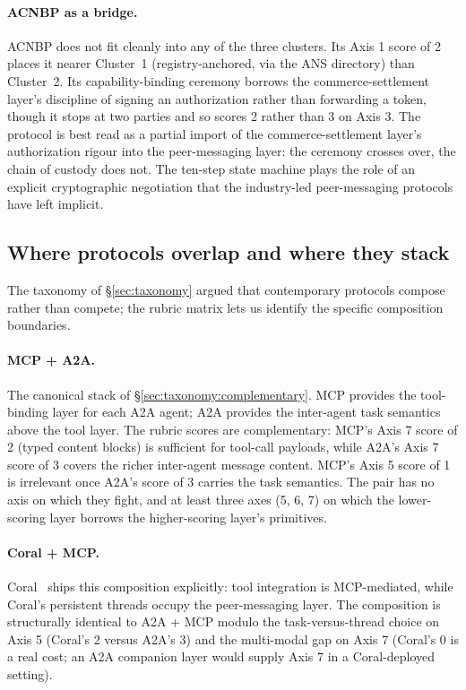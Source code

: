 \paragraph{ACNBP as a bridge.}
ACNBP does not fit cleanly into any of the three clusters.
Its Axis 1 score of 2 places it nearer Cluster~1
(registry-anchored, via the ANS directory) than Cluster~2.
Its capability-binding ceremony borrows the
commerce-settlement layer's discipline of signing an
authorization rather than forwarding a token, though it
stops at two parties and so scores 2 rather than 3 on
Axis 3. The protocol is best read as a partial import of
the commerce-settlement layer's authorization rigour into
the peer-messaging layer: the ceremony crosses over, the
chain of custody does not. The ten-step state machine
plays the role of an explicit cryptographic negotiation
that the industry-led peer-messaging protocols have left
implicit.

\subsection{Where protocols overlap and where they stack}
\label{sec:comparison:stack}

The taxonomy of \S\ref{sec:taxonomy} argued that
contemporary protocols compose rather than compete; the
rubric matrix lets us identify the specific composition
boundaries.

\paragraph{MCP + A2A.}
The canonical stack of \S\ref{sec:taxonomy:complementary}.
MCP provides the tool-binding layer for each A2A agent;
A2A provides the inter-agent task semantics above the
tool layer. The rubric scores are complementary: MCP's
Axis 7 score of 2 (typed content blocks) is sufficient
for tool-call payloads, while A2A's Axis 7 score of 3
covers the richer inter-agent message content. MCP's
Axis 5 score of 1 is irrelevant once A2A's score of 3
carries the task semantics. The pair has no axis
on which they fight, and at least three axes (5, 6, 7)
on which the lower-scoring layer borrows the
higher-scoring layer's primitives.

\paragraph{Coral + MCP.}
Coral~\cite{spec_coral} ships this composition
explicitly: tool integration is MCP-mediated, while
Coral's persistent threads occupy the peer-messaging
layer. The composition is structurally identical to
A2A + MCP modulo the task-versus-thread choice on
Axis 5 (Coral's 2 versus A2A's 3) and the multi-modal
gap on Axis 7 (Coral's 0 is a real cost; an A2A
companion layer would supply Axis 7 in a
Coral-deployed setting).

